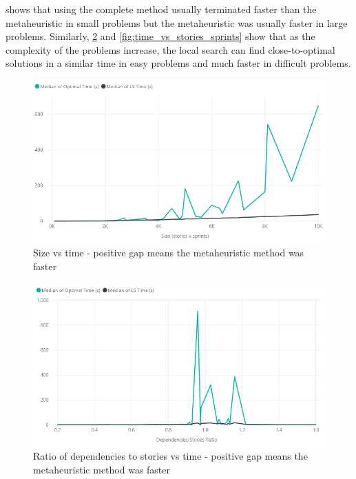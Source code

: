\FloatBarrier

 shows that using the complete method usually terminated faster than the metaheuristic in small problems but the metaheuristic was usually faster in large problems. Similarly, \cref{fig:time_vs_dependencies_stories} and \cref{fig:time_vs_stories_sprints} show that as the complexity of the problems increase, the local search can find close-to-optimal solutions in a similar time in easy problems and much faster in difficult problems.

\begin{figure}[h!]
    \centering
    \includegraphics[width=\textwidth]{Figures/FinalResults/annealing_time_size.png}
     \caption{Size vs time - positive gap means the metaheuristic method was faster}
     \label{fig:time_vs_size}
\end{figure}

\begin{figure}[h!]
    \centering
    \includegraphics[width=\textwidth]{Figures/FinalResults/annealing_time_dependencies_stories.png}
     \caption{Ratio of dependencies to stories vs time - positive gap means the metaheuristic method was faster}
     \label{fig:time_vs_dependencies_stories}
\end{figure}

